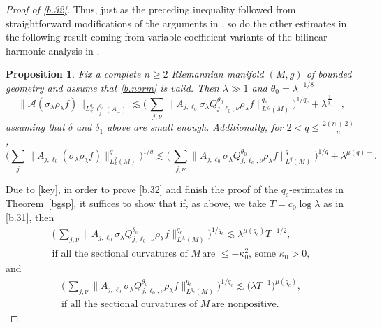 \documentclass[10pt]{amsart}
\newtheorem{proposition}[theorem]{Proposition}
\newcommand{\la}{\lambda}
\newcommand{\1}{{\bf 1}}
\newcommand{\A}{{\mathcal A}}
\begin{document}
\begin{proof}[Proof of \eqref{b.32}]
Thus, just as the preceding inequality followed from straightforward modifications of the arguments in \cite{HSp}, so do 
the other estimates in the following result coming from variable coefficient variants of the bilinear harmonic
analysis in \cite{TaoVargasVega}.



\begin{proposition}\label{keyprop}
Fix a complete $n\ge2$ Riemannian manifold $(M,g)$ of bounded geometry and assume that \eqref{b.norm} is valid.
Then $\la\gg 1$ and $\theta_0=\la^{-1/8}$
\begin{equation}\label{key}
\|\A(\sigma_\la \rho_\la f)\|_{L^{q_c}_x\ell^{q_c}_j(A_-)}
\lesssim \bigl( \, \sum_{j,\nu}\| A_{j,\ell_0}\sigma_\la Q^{\theta_0}_{j,\ell_0,\nu}\rho_\la f\|_{L^{q_c}(M)}^{q_c}\bigr)^{1/q_c}+\la^{\frac1{q_c}-},
\end{equation}
assuming that $\delta$ and $\delta_1$ above are small enough.  Additionally, for $ 2<q\le \tfrac{2(n+2)}{n}$,
\begin{equation}\label{key2}
\bigl(\sum_{j} \|    A_{j,\ell_0}  (\sigma_\la \rho_\la f)\|_{L^{q}_x(M)}^q\bigr)^{1/q}
\lesssim \bigl( \, \sum_{j,\nu}\| A_{j,\ell_0}\sigma_\la Q^{\theta_0}_{j,\ell_0,\nu}\rho_\la f\|_{L^{q}(M)}^{q}\bigr)^{1/q}+\la^{\mu(q)-}.
\end{equation}
\end{proposition}




Due to \eqref{key}, in order to prove \eqref{b.32} and finish the proof of the $q_c$-estimates
in Theorem~\ref{bgsp}, it suffices to show that if, as above, we take $T=c_0\log\la$ as in \eqref{b.31}, then
\begin{multline}\label{b.75}
\bigl( \, \sum_{j,\nu}\| A_{j,\ell_0}\sigma_\la Q^{\theta_0}_{j,\ell_0,\nu}\rho_\la f\|_{L^{q_c}(M)}^{q_c}\bigr)^{1/q_c}
\lesssim \la^{\mu(q_c)}T^{-1/2}, 
\\
\text{if all the sectional curvatures of } 
M \, \text{are } \le -\kappa_0^2, \,
\text{some }\kappa_0>0,
\end{multline}
and
\begin{multline}\label{b.76}
\bigl( \, \sum_{j,\nu}\| A_{j,\ell_0}\sigma_\la Q^{\theta_0}_{j,\ell_0,\nu}\rho_\la f\|_{L^{q_c}(M)}^{q_c}\bigr)^{1/q_c}
\lesssim 
\bigl(\la T^{-1}\bigr)^{\mu(q_c)}, 
\\
 \text{if all the sectional curvatures of } 
M \, \text{are nonpositive}.
\end{multline}



\end{proof}
\end{document}
